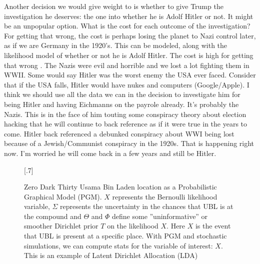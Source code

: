 \documentclass{article}
\begin{document}
\begin{multicols}{2}
Another decision we would give weight to is whether to give Trump the investigation he deserves: the one into whether he is Adolf Hitler or not. It might be an unpopular option. What is the cost for each outcome of the investigation? For getting that wrong, the cost is perhaps losing the planet to Nazi control later, as if we are Germany in the 1920's. This can be modeled, along with the likelihood model of whether or not he is Adolf Hitler. The cost is high for getting that wrong \cite{thinkingintime}. The Nazis were evil and horrible and we lost a lot fighting them in WWII. Some would say Hitler was the worst enemy the USA ever faced. Consider that if the USA falls, Hitler would have nukes and computers (Google/Apple). I think we should use all the data we can in the decision to investigate him for being Hitler and having Eichmanns on the payrole already. It's probably the Nazis. This is in the face of him touting some conspiracy theory about election hacking that he will continue to back reference as if it were true in the years to come. Hitler back referenced a debunked conspiracy about WWI being lost because of a Jewish/Communist conspiracy in the 1920s. That is happening right now. I'm worried he will come back in a few years and still be Hitler.

\closearticle

\end{multicols}

\begin{figure}

  \scalebox{.7}[.7]{}
  
  \caption{Zero Dark Thirty Usama Bin Laden location as a Probabilistic Graphical Model (PGM). $X$ represents the Bernoulli likelihood variable, $\Sigma$ represents the uncertainty in the chances that UBL is at the compound and $\Theta$ and $\Phi$ define some ''uninformative'' or smoother Dirichlet prior $T$ on the likelihood $X$. Here $X$ is the event that UBL is present at a specific place. With PGM and stochastic simulations, we can compute stats for the variable of interest: $X$. This is an example of Latent Dirichlet Allocation (LDA) \cite{lda}}
  
\end{figure}
\end{document}
